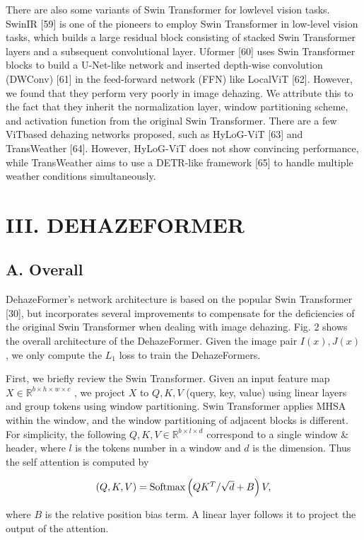 \documentclass{article}
\begin{document}
There are also some variants of Swin Transformer for lowlevel vision tasks. SwinIR [59] is one of the pioneers to employ Swin Transformer in low-level vision tasks, which builds a large residual block consisting of stacked Swin Transformer layers and a subsequent convolutional layer. Uformer [60] uses Swin Transformer blocks to build a U-Net-like network and inserted depth-wise convolution (DWConv) [61] in the feed-forward network (FFN) like LocalViT [62]. However, we found that they perform very poorly in image dehazing. We attribute this to the fact that they inherit the normalization layer, window partitioning scheme, and activation function from the original Swin Transformer. There are a few ViTbased dehazing networks proposed, such as HyLoG-ViT [63] and TransWeather [64]. However, HyLoG-ViT does not show convincing performance, while TransWeather aims to use a DETR-like framework [65] to handle multiple weather conditions simultaneously.


\section{III. DEHAZEFORMER}


\subsection{A. Overall}


DehazeFormer’s network architecture is based on the popular Swin Transformer [30], but incorporates several improvements to compensate for the deficiencies of the original Swin Transformer when dealing with image dehazing. Fig. 2 shows the overall architecture of the DehazeFormer. Given the image pair ${I(x),J(x)}$ , we only compute the $L_{1}$ loss to train the DehazeFormers.


First, we briefly review the Swin Transformer. Given an input feature map $X\in\mathbb{R}^{b\times h\times w\times c}$ , we project $X$ to $Q,K,V$ (query, key, value) using linear layers and group tokens using window partitioning. Swin Transformer applies MHSA within the window, and the window partitioning of adjacent blocks is different. For simplicity, the following $Q,K,V\in\mathbb{R}^{b\times l\times d}$ correspond to a single window & header, where $l$ is the tokens number in a window and $d$ is the dimension. Thus the self attention is computed by


\[
$$$$(Q,K,V)=\mathrm{Softmax}\left(Q K^{T}/\sqrt{d}+B\right)V,
\]


where $B$ is the relative position bias term. A linear layer follows it to project the output of the attention.
\end{document}

